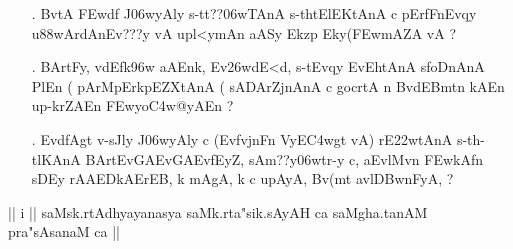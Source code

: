 \def\DevnagVersion{2.15}\documentclass{article}
\begin{document}
\begin{itemize}
\begin{itemize}
               \item[\dn kha] {\dn sM-th-tElEKtAnA\2 s\2cyn\2 Bv(\3FEwd\?f\? sMy s\2GVt\2 n {\rs ?\re}}
               
               \item[\dn ga] {\dn Bv(\3FEwd\?f\? Ev\38DwmAnAnA\2 h-tElEKtAlygtAn\2 s\2-th-t{\rs -\re}ElEKtAnA\2 dfA s\2r\322wZ\? cF\3FEwZyn\? c pErtoEq{\rs ,\re}nF n {\rs ?\re}} 
               
               \item[\dn gha] {\dn aEp c t\? ht\0ElEKtAly\? h-tElEKtAnA u\388wArdAn al\?Kn ECyAl\?KA,{\rs ,\re} aEQCEykAEn{\rs ,\re} aEQCEykvAcn\2 c{\rs --\re}et\?qA\2 km\0ZA\2 Env\0t\0n\? py\0(p aASy\2 vt\0t\? Ek {\rs ?\re}}
               \end{itemize}

\item[\dn 26.] {\dn BvtA\2 \3FEwd\?f\? J\306wyAly\0 s\2-tt{\rs ??\re}\306wTAnA\2 s\2-thtElEKtAnA\2 c pErfFnEvqy\? u\388wArdAnEv{\rs ???\re}y\? vA upl<ymAn aASy\2 Ek\2zp\2 Eky(\3FEwmAZA\2 vA {\rs ?\re} }

\item[\dn 27.] {\dn BArtFy\4, v\4d\?Efk\4\396w aAEnk\4, Ev\326wdE<d, s\2-tEvqy\? EvEhtAnA\2 s\2foDnAnA\2 PlEn {\rs (\re}\dn {} pArMpErkpEZXtAnA\2 {\rs (\re}\dn {} sADArZjnAnA\2 c gocrtA\2 n\?\2 BvdEBmt\?n kAEn up-krZAEn \3FEwyo\3C4w@yAEn {\rs ?\re}}

\item[\dn 28.] {\dn Evd\?fAgt\? v-s\2Jly\? J\306wyAly\? c {\rs (\re}EvfvjnFn\? VyE\3C4wgt\? vA{\rs )\re} rE\322wtAnA\2 s\2-th-tl\?KAnA\2{\rs ,\re} BArtEvGAEvGAEvfEyZ, sAm{\rs ??\re}y\306wtr-y c{\rs ,\re} aEvlMv\?n \3FEwkAfn\2 sDEy\2 rAAEDkAErEB, k\? mAgA\0, k\? c upAyA, Bv(mt\? avl\3DBwnFyA, {\rs ?\re}}

\end{itemize}

\begin{center}
{|| \dn i || saMsk.rtAdhyayanasya saMk.rta"sik.sAyAH ca  saMgha.tanAM pra"sAsanaM ca ||}
\end{center}
\end{document}
